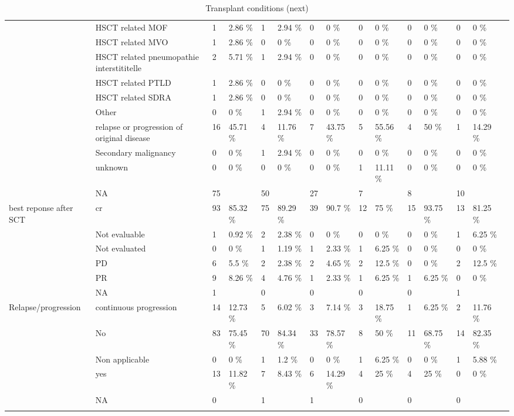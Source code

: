 \documentclass[a4paper,11pt] {article}
\begin{document}
\begin{landscape}
\begin{longtable}{lllllllllllllll}
   & HSCT related MOF & 1 & 2.86 \% & 1 & 2.94 \% & 0 & 0 \% & 0 & 0 \% & 0 & 0 \% & 0 & 0 \% &  \\ 
   & HSCT related MVO & 1 & 2.86 \% & 0 & 0 \% & 0 & 0 \% & 0 & 0 \% & 0 & 0 \% & 0 & 0 \% &  \\ 
   & HSCT related pneumopathie interstititelle & 2 & 5.71 \% & 1 & 2.94 \% & 0 & 0 \% & 0 & 0 \% & 0 & 0 \% & 0 & 0 \% &  \\ 
   & HSCT related PTLD & 1 & 2.86 \% & 0 & 0 \% & 0 & 0 \% & 0 & 0 \% & 0 & 0 \% & 0 & 0 \% &  \\ 
   & HSCT related SDRA & 1 & 2.86 \% & 0 & 0 \% & 0 & 0 \% & 0 & 0 \% & 0 & 0 \% & 0 & 0 \% &  \\ 
   & Other & 0 & 0 \% & 1 & 2.94 \% & 0 & 0 \% & 0 & 0 \% & 0 & 0 \% & 0 & 0 \% &  \\ 
   & relapse or progression of original disease & 16 & 45.71 \% & 4 & 11.76 \% & 7 & 43.75 \% & 5 & 55.56 \% & 4 & 50 \% & 1 & 14.29 \% &  \\ 
   & Secondary malignancy & 0 & 0 \% & 1 & 2.94 \% & 0 & 0 \% & 0 & 0 \% & 0 & 0 \% & 0 & 0 \% &  \\ 
   & unknown & 0 & 0 \% & 0 & 0 \% & 0 & 0 \% & 1 & 11.11 \% & 0 & 0 \% & 0 & 0 \% &  \\ 
   & NA & 75 &  & 50 &  & 27 &  & 7 &  & 8 &  & 10 &  &  \\ 
  best reponse after SCT & cr & 93 & 85.32 \% & 75 & 89.29 \% & 39 & 90.7 \% & 12 & 75 \% & 15 & 93.75 \% & 13 & 81.25 \% &  \\ 
   & Not evaluable & 1 & 0.92 \% & 2 & 2.38 \% & 0 & 0 \% & 0 & 0 \% & 0 & 0 \% & 1 & 6.25 \% &  \\ 
   & Not evaluated & 0 & 0 \% & 1 & 1.19 \% & 1 & 2.33 \% & 1 & 6.25 \% & 0 & 0 \% & 0 & 0 \% &  \\ 
   & PD & 6 & 5.5 \% & 2 & 2.38 \% & 2 & 4.65 \% & 2 & 12.5 \% & 0 & 0 \% & 2 & 12.5 \% &  \\ 
   & PR & 9 & 8.26 \% & 4 & 4.76 \% & 1 & 2.33 \% & 1 & 6.25 \% & 1 & 6.25 \% & 0 & 0 \% &  \\ 
   & NA & 1 &  & 0 &  & 0 &  & 0 &  & 0 &  & 1 &  &  \\ 
  Relapse/progression & continuous progression & 14 & 12.73 \% & 5 & 6.02 \% & 3 & 7.14 \% & 3 & 18.75 \% & 1 & 6.25 \% & 2 & 11.76 \% &  \\ 
   & No & 83 & 75.45 \% & 70 & 84.34 \% & 33 & 78.57 \% & 8 & 50 \% & 11 & 68.75 \% & 14 & 82.35 \% &  \\ 
   & Non applicable  & 0 & 0 \% & 1 & 1.2 \% & 0 & 0 \% & 1 & 6.25 \% & 0 & 0 \% & 1 & 5.88 \% &  \\ 
   & yes & 13 & 11.82 \% & 7 & 8.43 \% & 6 & 14.29 \% & 4 & 25 \% & 4 & 25 \% & 0 & 0 \% &  \\ 
   & NA & 0 &  & 1 &  & 1 &  & 0 &  & 0 &  & 0 &  &  \\ 
   \hline
\hline
\caption{Transplant conditions (next)} 
\label{tab:traa}
\end{longtable}\end{landscape}
\end{document}
